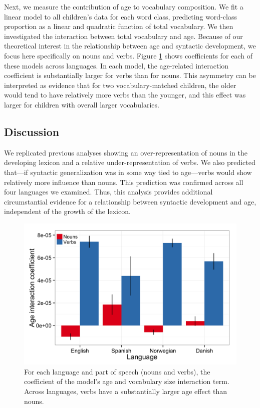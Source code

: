 \documentclass[10pt,letterpaper]{article}
\begin{document}
Next, we measure the contribution of age to vocabulary composition. We fit a linear model to all children's data for each word class, predicting word-class proportion as a linear and quadratic function of total vocabulary. We then investigated the interaction between total vocabulary and age. Because of our theoretical interest in the relationship between age and syntactic development, we focus here specifically on nouns and verbs. Figure \ref{fig:coefs_noun_verb} shows coefficients for each of these models across languages. In each model, the age-related interaction coefficient is substantially larger for verbs than for nouns. This asymmetry can be interpreted as evidence that for two vocabulary-matched children, the older would tend to have relatively more verbs than the younger, and this effect was larger for children with overall larger vocabularies. 

\subsection{Discussion}

We replicated previous analyses showing an over-representation of nouns in the developing lexicon and a relative under-representation of verbs. We also predicted that---if syntactic generalization was in some way tied to age---verbs would show relatively more influence than nouns. This prediction was confirmed across all four languages we examined. Thus, this analysis provides additional circumstantial evidence for a relationship between syntactic development and age, independent of the growth of the lexicon.

\begin{figure}[!tb]
\centering
\includegraphics[width=\linewidth]{plots/coefs_noun_verb.png}
\caption{\label{fig:coefs_noun_verb} For each language and part of speech (nouns and verbs), the coefficient of the model's age and vocabulary size interaction term. Across languages, verbs have a substantially larger age effect than nouns. }
\end{figure}
\end{document}
